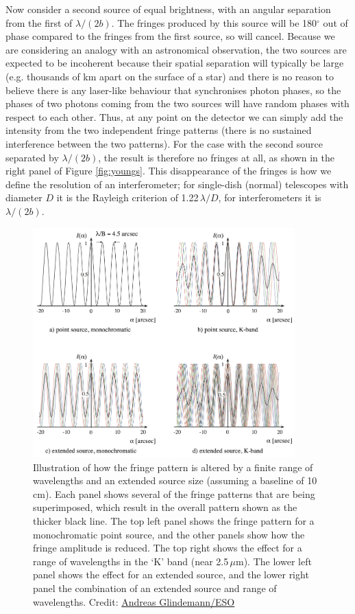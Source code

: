 \documentclass[11pt]{article}
\begin{document}
Now consider a second source of equal brightness, with an angular separation from the first of $\lambda/(2b)$. The fringes produced by this source will be 180$^\circ$ out of phase compared to the fringes from the first source, so will cancel. Because we are considering an analogy with an astronomical observation, the two sources are expected to be incoherent because their spatial separation will typically be large (e.g. thousands of km apart on the surface of a star) and there is no reason to believe there is any laser-like behaviour that synchronises photon phases, so the phases of two photons coming from the two sources will have random phases with respect to each other. Thus, at any point on the detector we can simply add the intensity from the two independent fringe patterns (there is no sustained interference between the two patterns). For the case with the second source separated by $\lambda/(2b)$, the result is therefore no fringes at all, as shown in the right panel of Figure \ref{fig:youngs}. This disappearance of the fringes is how we define the resolution of an interferometer; for single-dish (normal) telescopes with diameter $D$ it is the Rayleigh criterion of 1.22\,$\lambda/D$, for interferometers it is $\lambda/(2b)$.

\begin{figure}[h!]
    \centering
    \includegraphics[width=0.9\textwidth]{doc/coherence.png}
    \caption{Illustration of how the fringe pattern is altered by a finite range of wavelengths and an extended source size (assuming a baseline of 10\,cm). Each panel shows several of the fringe patterns that are being superimposed, which result in the overall pattern shown as the thicker black line. The top left panel shows the fringe pattern for a monochromatic point source, and the other panels show how the fringe amplitude is reduced. The top right shows the effect for a range of wavelengths in the `K' band (near 2.5\,$\mu$m). The lower left panel shows the effect for an extended source, and the lower right panel the combination of an extended source and range of wavelengths. Credit: \href{https://www.eso.org/sci/facilities/paranal/telescopes/vlti/tuto/tutorial_spatial_interferometry.pdf}{Andreas Glindemann/ESO}}
    \label{fig:coherence}
\end{figure}
\end{document}
